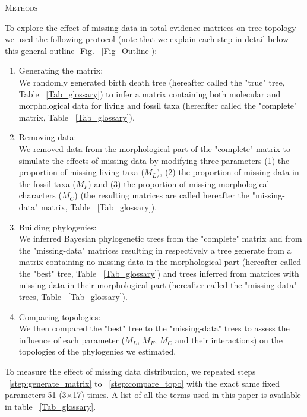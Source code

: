 \documentclass[12pt,letterpaper]{article}
\renewcommand{\section}[1]{%
\bigskip
\begin{center}
\begin{Large}
\normalfont\scshape #1
\medskip
\end{Large}
\end{center}}
\begin{document}
\section{Methods} %
To explore the effect of missing data in total evidence matrices on tree topology we used the following protocol (note that we explain each step in detail below this general outline -Fig. ~\ref{Fig_Outline}):
\begin{enumerate}
\item{Generating the matrix:} \label{step:generate_matrix} \\
We randomly generated birth death tree (hereafter called the "true" tree, Table ~\ref{Tab_glossary}) to infer a matrix containing both molecular and morphological data for living and fossil taxa (hereafter called the "complete" matrix, Table ~\ref{Tab_glossary}).
\item{Removing data:} \label{step:remove_data} \\
We removed data from the morphological part of the "complete" matrix to simulate the effects of missing data by modifying three parameters (1) the proportion of missing living taxa ($M_{L}$), (2) the proportion of missing data in the fossil taxa ($M_{F}$) and (3) the proportion of missing morphological characters ($M_{C}$) (the resulting matrices are called hereafter the "missing-data" matrix, Table ~\ref{Tab_glossary}).
\item{Building phylogenies:} \label{step:build_phylo} \\
We inferred Bayesian phylogenetic trees from the "complete" matrix and from the "missing-data" matrices resulting in respectively a tree generate from a matrix containing no missing data in the morphological part (hereafter called the "best" tree, Table ~\ref{Tab_glossary}) and trees inferred from matrices with missing data in their morphological part (hereafter called the "missing-data" trees, Table ~\ref{Tab_glossary}).
\item{Comparing topologies:} \label{step:compare_topo} \\
We then compared the "best" tree to the "missing-data" trees to assess the influence of each parameter ($M_{L}$, $M_{F}$, $M_{C}$ and their interactions) on the topologies of the phylogenies we estimated.
\end{enumerate}
To measure the effect of missing data distribution, we repeated steps ~\ref{step:generate_matrix} to ~\ref{step:compare_topo} with the exact same fixed parameters 51 (3$\times$17) times. %
A list of all the terms used in this paper is available in table ~\ref{Tab_glossary}.
\end{document}
